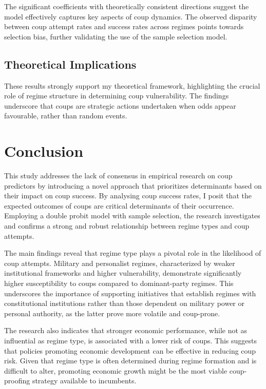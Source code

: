 \documentclass[
  12pt,
]{report}
\begin{document}
The significant coefficients with theoretically consistent directions
suggest the model effectively captures key aspects of coup dynamics. The
observed disparity between coup attempt rates and success rates across
regimes points towards selection bias, further validating the use of the
sample selection model.

\subsection{Theoretical Implications}\label{theoretical-implications}

These results strongly support my theoretical framework, highlighting
the crucial role of regime structure in determining coup vulnerability.
The findings underscore that coups are strategic actions undertaken when
odds appear favourable, rather than random events.

\section{Conclusion}\label{conclusion}

This study addresses the lack of consensus in empirical research on coup
predictors by introducing a novel approach that prioritizes determinants
based on their impact on coup success. By analysing coup success rates,
I posit that the expected outcomes of coups are critical determinants of
their occurrence. Employing a double probit model with sample selection,
the research investigates and confirms a strong and robust relationship
between regime types and coup attempts.

The main findings reveal that regime type plays a pivotal role in the
likelihood of coup attempts. Military and personalist regimes,
characterized by weaker institutional frameworks and higher
vulnerability, demonstrate significantly higher susceptibility to coups
compared to dominant-party regimes. This underscores the importance of
supporting initiatives that establish regimes with constitutional
institutions rather than those dependent on military power or personal
authority, as the latter prove more volatile and coup-prone.

The research also indicates that stronger economic performance, while
not as influential as regime type, is associated with a lower risk of
coups. This suggests that policies promoting economic development can be
effective in reducing coup risk. Given that regime type is often
determined during regime formation and is difficult to alter, promoting
economic growth might be the most viable coup-proofing strategy
available to incumbents.
\end{document}
